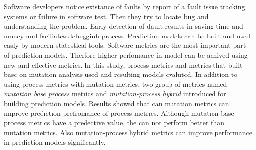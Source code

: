 
Software developers notice existance of  faults by report of a fault issue tracking systems  or failure in software test. Then they try to locate bug and understanding the problem. Early detection of dault results in saving time and money and faciliates debugginh process. Prediction models can be built and used easly by modern statestical tools. Software metrics are the most important part of prediction models. Therfore higher perfomance in model can be achived using new and effective metrics. In this study, process metrics and metrics that built base on mutation analysis used and resulting models evaluted. In addition to using process metrics with mutation metrics, two group of metrics named \textit{mutation base process}  metrics and \textit{mutation-process hybrid} introduced for building prediction models. Results showed that can mutation metrics can improve prediction prefromance of process metrics. Although mutation base process metrics have a predective value, the can not perform better than mutation metrics. Also mutation-process hybrid metrics can improve performance in prediction models significantly. 
